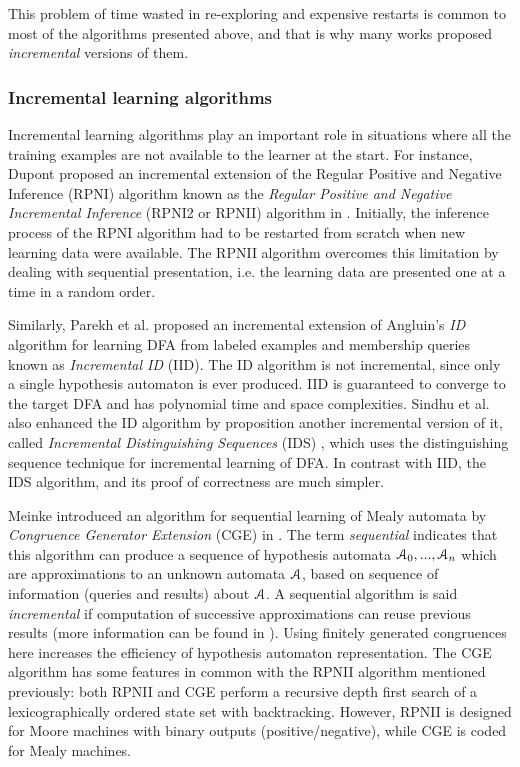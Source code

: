 This problem of time wasted in re-exploring and expensive
restarts is common to most of the algorithms presented above, and
that is why many works proposed \textit{incremental} versions of
them.

\subsubsection{Incremental learning algorithms}
\label{sec:related:modelinf:active-increment}

Incremental learning algorithms play an important role in
situations where all the training examples are not available to
the learner at the start. For instance, Dupont proposed an
incremental extension of the Regular Positive and Negative
Inference (RPNI) algorithm known as the \textit{Regular Positive
and Negative Incremental Inference} (RPNI2 or RPNII) algorithm in
\cite{Dupont96incrementalregular}. Initially, the inference
process of the RPNI algorithm had to be restarted from scratch
when new learning data were available. The RPNII algorithm
overcomes this limitation by dealing with sequential
presentation, i.e. the learning data are presented one at a time
in a random order.

Similarly, Parekh et al. \cite{parekh98} proposed an incremental
extension of Angluin's \textit{ID} algorithm \cite{ANGLUIN198176}
for learning DFA from labeled examples and membership queries
known as \textit{Incremental ID} (IID). The ID algorithm is not
incremental, since only a single hypothesis automaton is ever
produced. IID is guaranteed to converge to the target DFA and has
polynomial time and space complexities. Sindhu et al. also
enhanced the ID algorithm by proposition another incremental
version of it, called \textit{Incremental Distinguishing
Sequences} (IDS) \cite{journals/corr/abs-1206-2691}, which uses
the distinguishing sequence technique for incremental learning of
DFA. In contrast with IID, the IDS algorithm, and its proof of
correctness are much simpler.

Meinke introduced an algorithm for sequential learning of Mealy
automata by \textit{Congruence Generator Extension} (CGE) in
\cite{meinkeCGE}. The term \textit{sequential} indicates that
this algorithm can produce a sequence of hypothesis automata
$\EuScript{A}_0, ..., \EuScript{A}_n$ which are approximations to
an unknown automata $\EuScript{A}$, based on sequence of
information (queries and results) about $\EuScript{A}$. A
sequential algorithm is said \textit{incremental} if computation
of successive approximations can reuse previous results (more
information can be found in \cite{Parekh00grammarinference}).
Using finitely generated congruences here increases the
efficiency of hypothesis automaton representation. The CGE
algorithm has some features in common with the RPNII algorithm
mentioned previously: both RPNII and CGE perform a recursive
depth first search of a lexicographically ordered state set with
backtracking. However, RPNII is designed for Moore machines with
binary outputs (positive/negative), while CGE is coded for Mealy
machines.

